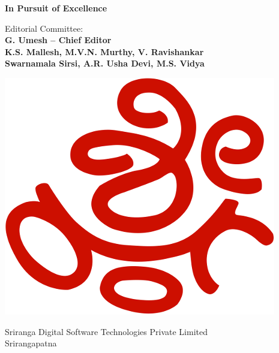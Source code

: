 \thispagestyle{empty}
\begin{center}
{\fontsize{24}{26} \selectfont\sf \textbf{In Pursuit of Excellence}}\\[10pt]
{\fontsize{18}{20} }
\vfill


{\large Editorial Committee:}\\[4pt]
{\fontsize{12}{14}\selectfont\bfseries 
G. Umesh – Chief Editor\\[8pt]
K.S. Mallesh, M.V.N. Murthy, V. Ravishankar\\[8pt]
Swarnamala Sirsi, A.R. Usha Devi, M.S. Vidya
}
\vfill

\includegraphics[scale=0.4]{src/images/publisher.png}
\smallskip

{\fontsize{11}{13}\selectfont Sriranga Digital Software Technologies Private Limited\\[2pt]  
 Srirangapatna}


\end{center}






